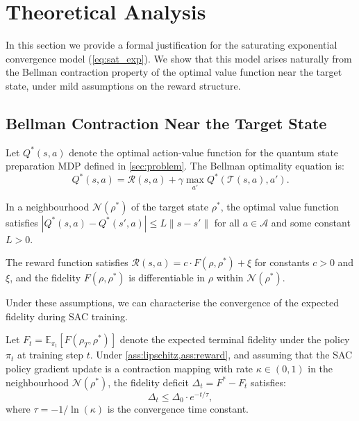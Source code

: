 \section{Theoretical Analysis}
\label{sec:theory}

In this section we provide a formal justification for the saturating exponential
convergence model (\cref{eq:sat_exp}). We show that this model arises naturally
from the Bellman contraction property of the optimal value function near the
target state, under mild assumptions on the reward structure.

\subsection{Bellman Contraction Near the Target State}

Let $Q^*(s, a)$ denote the optimal action-value function for the quantum state
preparation MDP defined in \cref{sec:problem}. The Bellman optimality equation is:
\begin{equation}
  Q^*(s, a) = \mathcal{R}(s, a) + \gamma \max_{a'} Q^*(\mathcal{T}(s,a), a').
  \label{eq:bellman}
\end{equation}

\begin{assumption}
\label{ass:lipschitz}
In a neighbourhood $\mathcal{N}(\rho^*)$ of the target state $\rho^*$, the
optimal value function satisfies $|Q^*(s, a) - Q^*(s', a)| \leq L \|s - s'\|$
for all $a \in \mathcal{A}$ and some constant $L > 0$.
\end{assumption}

\begin{assumption}
\label{ass:reward}
The reward function satisfies $\mathcal{R}(s, a) = c \cdot F(\rho, \rho^*) + \xi$
for constants $c > 0$ and $\xi$, and the fidelity $F(\rho, \rho^*)$ is
differentiable in $\rho$ within $\mathcal{N}(\rho^*)$.
\end{assumption}

Under these assumptions, we can characterise the convergence of the expected
fidelity during SAC training.

\begin{proposition}
\label{prop:exp_conv}
Let $F_t = \mathbb{E}_{\pi_t}[F(\rho_T, \rho^*)]$ denote the expected terminal
fidelity under the policy $\pi_t$ at training step $t$. Under
\cref{ass:lipschitz,ass:reward}, and assuming that the SAC policy gradient update
is a contraction mapping with rate $\kappa \in (0, 1)$ in the neighbourhood
$\mathcal{N}(\rho^*)$, the fidelity deficit $\Delta_t = F^* - F_t$ satisfies:
\begin{equation}
  \Delta_t \leq \Delta_0 \cdot e^{-t/\tau},
  \label{eq:deficit_decay}
\end{equation}
where $\tau = -1/\ln(\kappa)$ is the convergence time constant.
\end{proposition}

